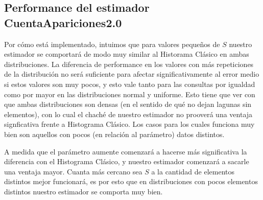 \subsection{Performance del estimador CuentaApariciones2.0\texttrademark}
Por cómo está implementado, intuimos que para valores pequeños de $S$ nuestro estimador se comportará de modo muy similar al Historama Clásico en ambas distribuciones. La diferencia de performance en los valores con más repeticiones de la distribución no será suficiente para afectar significativamente al error medio si estos valores son muy pocos, y esto vale tanto para las consultas por igualdad como por mayor en las distribuciones normal y uniforme. Esto tiene que ver con que ambas distribuciones son densas (en el sentido de qué no dejan lagunas sin elementos), con lo cual el chaché de nuestro estimador no prooverá una ventaja signficativa frente a Histograma Clásico. Los casos para los cuales funciona muy bien son aquellos con pocos (en relación al parámetro) datos distintos.

A medida que el parámetro aumente comenzará a hacerse más significativa la diferencia con el Histograma Clásico, y nuestro estimador comenzará a sacarle una ventaja mayor. Cuanta más cercano sea $S$ a la cantidad de elementos distintos mejor funcionará, es por esto que en distribuciones con pocos elementos distintos nuestro estimador se comporta muy bien.

